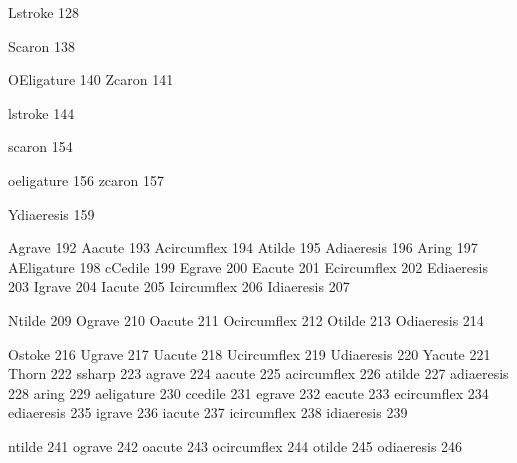  Lstroke           128

 Scaron            138

 OEligature        140
 Zcaron            141

 lstroke           144

 scaron            154

 oeligature        156
 zcaron            157

 Ydiaeresis        159

 Agrave            192
 Aacute            193
 Acircumflex       194
 Atilde            195
 Adiaeresis        196      
 Aring             197
 AEligature        198
 cCedile           199
 Egrave            200
 Eacute            201
 Ecircumflex       202
 Ediaeresis        203
 Igrave            204
 Iacute            205
 Icircumflex       206
 Idiaeresis        207

 Ntilde            209
 Ograve            210
 Oacute            211
 Ocircumflex       212
 Otilde            213
 Odiaeresis        214

 Ostoke            216
 Ugrave            217
 Uacute            218
 Ucircumflex       219
 Udiaeresis        220
 Yacute            221
 Thorn             222
 ssharp            223
 agrave            224
 aacute            225
 acircumflex       226
 atilde            227
 adiaeresis        228      
 aring             229
 aeligature        230
 ccedile           231
 egrave            232
 eacute            233
 ecircumflex       234
 ediaeresis        235      
 igrave            236
 iacute            237
 icircumflex       238
 idiaeresis        239

 ntilde            241
 ograve            242
 oacute            243
 ocircumflex       244
 otilde            245
 odiaeresis        246

